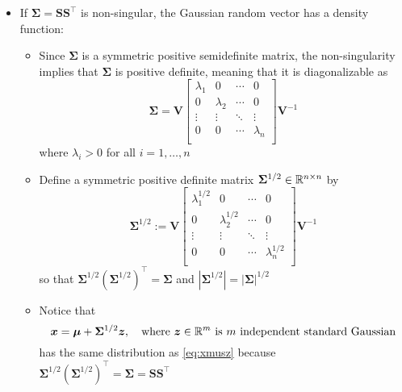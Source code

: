 \documentclass[12pt,a4paper]{article}
\begin{document}
\begin{itemize}
\begin{itemize}
  \item If $\bm{\Sigma}=\bm{S}\bm{S}^{\top}$ is non-singular,
    the Gaussian random vector has a density function:
    \begin{itemize}
    \item Since $\bm{\Sigma}$ is a symmetric positive semidefinite matrix,
      the non-singularity implies that $\bm{\Sigma}$ is positive definite,
      meaning that it is diagonalizable as
      \begin{equation}\nonumber%
        \bm{\Sigma} =
        \bm{V}
        \begin{bmatrix}
          \lambda_{1} & 0 & \cdots & 0 \\
          0 & \lambda_{2} & \cdots & 0 \\
          \vdots & \vdots & \ddots & \vdots \\
          0 & 0 & \cdots & \lambda_{n} \\
        \end{bmatrix}
        \bm{V}^{-1}
      \end{equation}
      where $\lambda_{i}>0$ for all $i=1,\ldots, n$
    \item Define a symmetric positive definite matrix $\bm{\Sigma}^{1/2}\in \mathbb{R}^{n\times n}$ by
      \begin{equation}\nonumber%
        \bm{\Sigma}^{1/2}:=
        \bm{V}
        \begin{bmatrix}
          \lambda_{1}^{1/2} & 0 & \cdots & 0 \\
          0 & \lambda_{2}^{1/2} & \cdots & 0 \\
          \vdots & \vdots & \ddots & \vdots \\
          0 & 0 & \cdots & \lambda_{n}^{1/2} \\
        \end{bmatrix}
        \bm{V}^{-1}
      \end{equation}
      so that
      $\bm{\Sigma}^{1/2}(\bm{\Sigma}^{1/2})^{\top}=\bm{\Sigma}$
      and
      $|\bm{\Sigma}^{1/2}|=|\bm{\Sigma}|^{1/2}$
    \item Notice that
      \begin{equation}\nonumber%
        \bm{x} = \bm{\mu} + \bm{\Sigma}^{1/2}\bm{z},
        \quad\text{where $\bm{z}\in \R^{m}$ is $m$ independent standard Gaussian}
      \end{equation}
      has the same distribution as \eqref{eq:xmusz} because $\bm{\Sigma}^{1/2}(\bm{\Sigma}^{1/2})^{\top}=\bm{\Sigma} = \bm{S}\bm{S}^{\top}$


\end{itemize}
\end{itemize}
\end{itemize}
\end{document}
